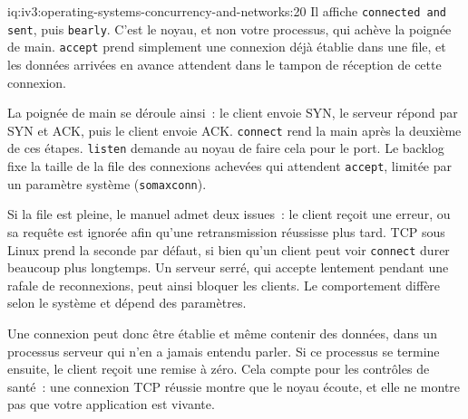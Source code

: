 \begin{solution}{iq:iv3:operating-systems-concurrency-and-networks:20}
Il affiche \texttt{connected and sent}, puis \texttt{b\textquotesingle{}early\textquotesingle{}}. C'est le noyau, et non votre processus, qui achève la poignée de main. \texttt{accept} prend simplement une connexion déjà établie dans une file, et les données arrivées en avance attendent dans le tampon de réception de cette connexion.

La poignée de main se déroule ainsi~: le client envoie SYN, le serveur répond par SYN et ACK, puis le client envoie ACK. \texttt{connect} rend la main après la deuxième de ces étapes. \texttt{listen} demande au noyau de faire cela pour le port. Le backlog fixe la taille de la file des connexions achevées qui attendent \texttt{accept}, limitée par un paramètre système (\texttt{somaxconn}).

Si la file est pleine, le manuel admet deux issues~: le client reçoit une erreur, ou sa requête est ignorée afin qu'une retransmission réussisse plus tard. TCP sous Linux prend la seconde par défaut, si bien qu'un client peut voir \texttt{connect} durer beaucoup plus longtemps. Un serveur serré, qui accepte lentement pendant une rafale de reconnexions, peut ainsi bloquer les clients. Le comportement diffère selon le système et dépend des paramètres.

Une connexion peut donc être établie et même contenir des données, dans un processus serveur qui n'en a jamais entendu parler. Si ce processus se termine ensuite, le client reçoit une remise à zéro. Cela compte pour les contrôles de santé~: une connexion TCP réussie montre que le noyau écoute, et elle ne montre pas que votre application est vivante.

\end{solution}

